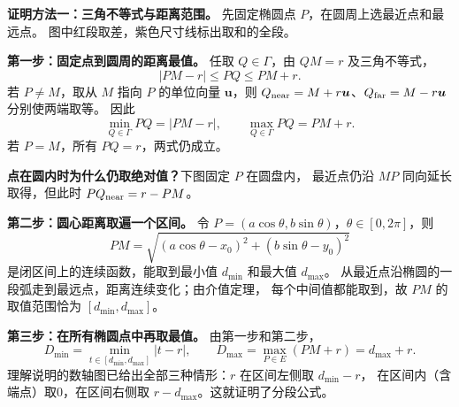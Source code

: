 \begin{proofbox}
\begin{minipage}{\linewidth}
\textbf{证明方法一：三角不等式与距离范围。}
先固定椭圆点 $P$，在圆周上选最近点和最远点。
图中红段取差，紫色尺寸线标出取和的全段。

\end{minipage}
\textbf{第一步：固定点到圆周的距离最值。}
任取 $Q\in\Gamma$，由 $QM=r$ 及三角不等式，
\[
 |PM-r|\le PQ\le PM+r.
\]
若 $P\ne M$，取从 $M$ 指向 $P$ 的单位向量 $\boldsymbol u$，则
$Q_{\rm near}=M+r\boldsymbol u$、$Q_{\rm far}=M-r\boldsymbol u$ 分别使两端取等。
因此
\[
 \min_{Q\in\Gamma}PQ=|PM-r|,\qquad
 \max_{Q\in\Gamma}PQ=PM+r.
\]
若 $P=M$，所有 $PQ=r$，两式仍成立。

\textbf{点在圆内时为什么仍取绝对值？}下图固定 $P$ 在圆盘内，
最近点仍沿 $MP$ 同向延长取得，但此时 $PQ_{\rm near}=r-PM$。


\textbf{第二步：圆心距离取遍一个区间。}
令 $P=(a\cos\theta,b\sin\theta)$，$\theta\in[0,2\pi]$，则
\[
 PM=\sqrt{(a\cos\theta-x_0)^2+(b\sin\theta-y_0)^2}
\]
是闭区间上的连续函数，能取到最小值 $d_{\min}$ 和最大值 $d_{\max}$。
从最近点沿椭圆的一段弧走到最远点，距离连续变化；由介值定理，
每个中间值都能取到，故 $PM$ 的取值范围恰为 $[d_{\min},d_{\max}]$。

\textbf{第三步：在所有椭圆点中再取最值。}
由第一步和第二步，
\[
 D_{\min}=\min_{t\in[d_{\min},d_{\max}]}|t-r|,
 \qquad D_{\max}=\max_{P\in E}(PM+r)=d_{\max}+r.
\]
理解说明的数轴图已给出全部三种情形：$r$ 在区间左侧取 $d_{\min}-r$，
在区间内（含端点）取0，在区间右侧取 $r-d_{\max}$。这就证明了分段公式。
\end{proofbox}

